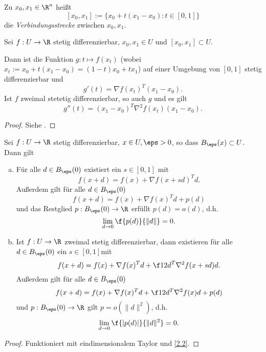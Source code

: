 \begin{df} \label{2.1}
	Zu $x_0,x_1 \in \R^n$ heißt
	\[
		[x_0, x_1] := \big\{ x_0 + t(x_1-x_0) : t \in [0,1] \big\}
	\]
	die \emph{Verbindungsstrecke} zwischen $x_0, x_1$.
\end{df}

\begin{st} \label{2.2}
	Sei $f: U \to \R$ stetig differenzierbar, $x_0, x_1 \in U$ und $[x_0, x_1] \subset U$.

	Dann ist die Funktion $g: t \mapsto f(x_t)$ (wobei $x_t := x_0 + t(x_1 - x_0) = (1-t) x_0 + tx_1$) auf einer Umgebung von $[0,1]$ stetig differenzierbar und
	\[
		g'(t) = \nabla f(x_t)^T (x_1 - x_0).
	\]
	Ist $f$ zweimal stetetig differenzierbar, so auch $g$ und es gilt
	\[
		g''(t) = (x_1 - x_0)^T \nabla^2 f(x_t) (x_1 - x_0).
	\]
	\begin{proof}
		Siehe .
	\end{proof}
\end{st}

\begin{st} \label{2.3}
	Sei $f : U \to \R$ stetig differenzierbar, $x\in U, \eps > 0$, so dass $B_\eps(x) \subset U$.
	Dann gilt
	\begin{enumerate}[(a)]
		\item
			Für alle $d \in B_\eps(0)$ existiert ein $s \in [0,1]$ mit
			\[
				f(x+d) = f(x) + \nabla f(x + sd)^T d.
			\]
			Außerdem gilt für alle $d \in B_\eps(0)$
			\[
				f(x+d) = f(x) + \nabla f(x)^T d + p(d)
			\]
			und das Restglied $p: B_\eps(0) \to \R$ erfüllt $p(d) = o(d)$, d.h.
			\[
				\lim_{d\to 0} \f {p(d)}{\|d\|} = 0.
			\]
		\item
			Ist $f: U \to \R$ zweimal stetig differenzierbar, dann existieren für alle $d \in B_\eps(0)$ ein $s \in [0,1]$mit
			\[
				f(x+d)
				= f(x) + \nabla f(x)^T d + \f 12 d^T \nabla^2 f(x+sd) d.
			\]
			Außerdem gilt für alle $d \in B_\eps(0)$
			\[
				f(x+d) = f(x) + \nabla f(x)^T d + \f 12 d^T \nabla^2 f(x) d + p(d)
			\]
			und $p: B_\eps(0) \to \R$ gilt $p = o(\|d\|^2)$, d.h.
			\[
				\lim_{d\to 0} \f{|p(d)|}{\|d\|^2} = 0.
			\]
	\end{enumerate}
	\begin{proof}
		Funktioniert mit eindimensionalem Taylor und \ref{2.2}.
	\end{proof}
\end{st}

